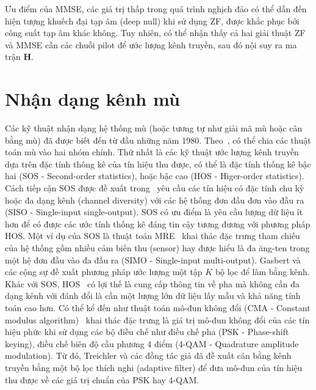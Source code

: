 Ưu điểm của MMSE, các giá trị thấp trong quá trình nghịch đảo có thể dẫn đến hiện tượng khuếch đại tạp âm (deep null) khi sử dụng ZF, được khắc phục bởi công suất tạp âm khác không. Tuy nhiên, có thể nhận thấy cả hai giải thuật ZF và MMSE cần các chuỗi pilot để ước lượng kênh truyền, sau đó nội suy ra ma trận $\mathbf{H}$.

\section{Nhận dạng kênh mù} \label{sec:blind}

Các kỹ thuật nhận dạng hệ thống mù (hoặc tương tự như giải mã mù hoặc cân bằng mù) đã được biết đến từ đầu những năm 1980. Theo~\cite{vilas2022}, có thể chia các thuật toán mù vào hai nhóm chính. Thứ nhất là các kỹ thuật ước lượng kênh truyền dựa trên đặc tính thông kê của tín hiệu thu được, có thể là đặc tính thống kê bậc hai (SOS - Second-order statistics), hoặc bậc cao (HOS - Higer-order statistics). Cách tiếp cận SOS được đề xuất trong~\cite{Tong1994} yêu cầu các tín hiệu có đặc tính chu kỳ hoặc đa dạng kênh (channel diversity) với các hệ thống đơn đầu đơn vào đầu ra (SISO - Single-input single-output). SOS có ưu điểm là yêu cầu lượng dữ liệu ít hơn để có được các ước tính thống kê đáng tin cậy tương đương với phương pháp HOS. Một ví dụ của SOS là thuật toán MRE~\cite{original} khai thác đặc trưng tham chiếu của hệ thống gồm nhiều cảm biến thu (sensor) hay được hiểu là đa ăng-ten trong một hệ đơn đầu vào đa đầu ra (SIMO - Single-input multi-output). Gasbert và các cộng sự đề xuất phương pháp ước lượng một tập $K$ bộ lọc để làm bằng kênh.
Khác với SOS, HOS~\cite{Giannakis1997} có lợi thế là cung cấp thông tin về pha mà không cần đa dạng kênh với đánh đổi là cần một lượng lớn dữ liệu lấy mẫu và khả năng tính toán cao hơn. Có thể kể đến như thuật toán mô-đun không đổi (CMA - Constant modulus algorithm)~\cite{Treichler1983} khai thác đặc trưng là giá trị mô-đun không đổi của các tín hiệu phức khi sử dụng các bộ điều chế như điều chế pha (PSK - Phase-shift keying), điều chế biên độ cầu phương 4 điểm (4-QAM - Quadrature amplitude modulation). Từ đó, Treichler và các đồng tác giả đã đề xuất cân bằng kênh truyền bằng một bộ lọc thích nghi (adaptive filter) để đưa mô-đun của tín hiệu thu được về các giá trị chuẩn của PSK hay 4-QAM.

